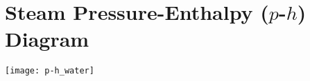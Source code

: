 \section{Steam Pressure-Enthalpy ($p$-$h$) Diagram}
\begin{center}
  \texttt{[image: p-h\_water]}
\end{center}
\restoregeometry
